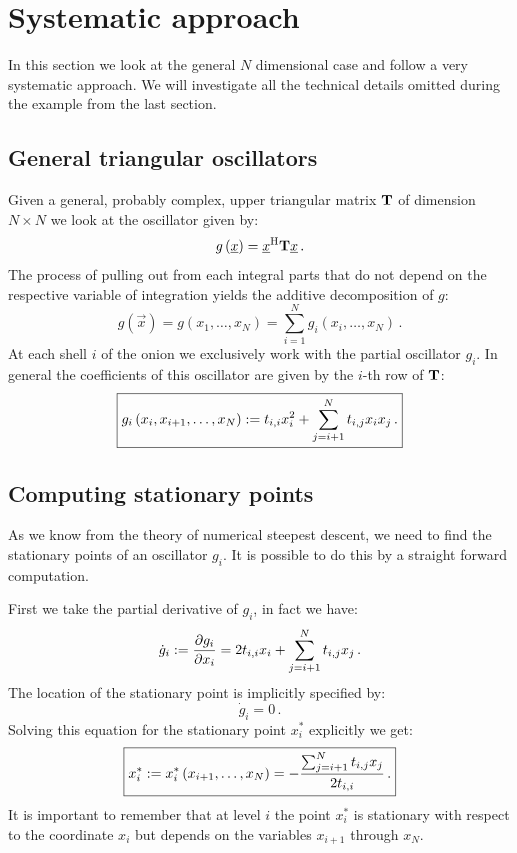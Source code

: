 \documentclass[a4paper,10pt]{article}
\begin{document}
\section{Systematic approach}


In this section we look at the general $N$ dimensional case
and follow a very systematic approach. We will investigate
all the technical details omitted during the example from
the last section.


\subsection{General triangular oscillators}


Given a general, probably complex, upper triangular
matrix $\mathbf{T}$ of dimension $N \times N$ we look at
the oscillator given by:
\begin{equation}\label{eq:triangular_oscillator}
  g\left(\underline{x}\right) = \underline{x}{}^{\textnormal{H}} \mathbf{T} \underline{x} \,.
\end{equation}
The process of pulling out from each integral parts that do not
depend on the respective variable of integration yields the
additive decomposition of $g$:
\begin{equation}
  g\left(\vec{x}\right) = g\left(x_1, \ldots, x_N\right) = \sum_{i=1}^N g_i(x_i, \ldots, x_N) \,.
\end{equation}
At each shell $i$ of the onion we exclusively work with the
partial oscillator $g_i$. In general the coefficients of this
oscillator are given by the $i$-th row of $\mathbf{T}$:
\begin{equation}\label{eq:general_partial_gi}
\boxed{
  g_i\left(x_i, x_{i+1}, \ldots, x_N\right)
  := t_{i,i} x_i^2 + \sum_{j=i+1}^{N} t_{i,j} x_i x_j \,.
}
\end{equation}


\subsection{Computing stationary points}


As we know from the theory of numerical steepest descent, we need
to find the stationary points of an oscillator $g_i$. It is possible
to do this by a straight forward computation.

First we take the partial derivative of $g_i$, in fact we have:
\begin{equation}
 \dot{g}_i := \frac{\partial g_i}{\partial x_i}
              = 2 t_{i,i} x_i + \sum_{j=i+1}^{N} t_{i,j} x_j \,.
\end{equation}
The location of the stationary point is implicitly specified by:
\begin{equation}
  \dot{g}_i = 0 \,.
\end{equation}
Solving this equation for the stationary point $x^*_i$ explicitly we get:
\begin{equation}\label{eq:stationary_point_xi}
\boxed{
  x_i^*
  := x_i^{*}\left(x_{i+1}, \ldots, x_N\right)
  = - \frac{\sum_{j=i+1}^{N} t_{i,j} x_j}{2 t_{i,i}} \,.
}
\end{equation}
It is important to remember that at level $i$ the point $x_i^*$
is stationary with respect to the coordinate $x_i$ but
depends on the variables $x_{i+1}$ through $x_N$.
\end{document}

